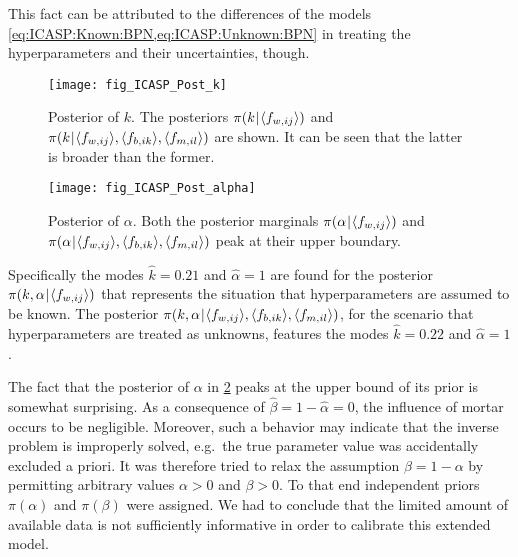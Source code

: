 This fact can be attributed to the differences of the models \cref{eq:ICASP:Known:BPN,eq:ICASP:Unknown:BPN} in treating the hyperparameters and their uncertainties, though.
\begin{figure}[ht]
  \centering
  \texttt{[image: fig\_ICASP\_Post\_k]}
  \caption[Posterior of \(k\)]{Posterior of \(k\).
           The posteriors \(\pi(k {\:\!}|{\:\!} \langle{f_{w,ij}}\rangle)\) and \(\pi(k {\:\!}|{\:\!} \langle{f_{w,ij}}\rangle,\langle{f_{b,ik}}\rangle,\langle{f_{m,il}}\rangle)\) are shown.
           It can be seen that the latter is broader than the former.
          }
  \label{fig:ICASP:Post:k}
\end{figure}
\begin{figure}[ht]
  \centering
  \texttt{[image: fig\_ICASP\_Post\_alpha]}
  \caption[Posterior of \(\alpha\)]{Posterior of \(\alpha\).
           Both the posterior marginals \(\pi(\alpha {\:\!}|{\:\!} \langle{f_{w,ij}}\rangle)\) and \(\pi(\alpha {\:\!}|{\:\!} \langle{f_{w,ij}}\rangle,\langle{f_{b,ik}}\rangle,\langle{f_{m,il}}\rangle)\) peak at their upper boundary.
          }
  \label{fig:ICASP:Post:alpha}
\end{figure}
\par %
Specifically the modes \(\hat{k} = 0.21\) and \(\hat{\alpha} = 1\) are found for the posterior \(\pi(k,\alpha {\:\!}|{\:\!} \langle{f_{w,ij}}\rangle)\) that represents the situation that hyperparameters are assumed to be known.
The posterior \(\pi(k,\alpha {\:\!}|{\:\!} \langle{f_{w,ij}}\rangle,\langle{f_{b,ik}}\rangle,\langle{f_{m,il}}\rangle)\), for the scenario that hyperparameters are treated as unknowns, features the modes \(\hat{k} = 0.22\) and \(\hat{\alpha} = 1\).
\par %
The fact that the posterior of \(\alpha\) in \cref{fig:ICASP:Post:alpha} peaks at the upper bound of its prior is somewhat surprising.
As a consequence of \(\hat{\beta} = 1-\hat{\alpha} = 0\), the influence of mortar occurs to be negligible.
Moreover, such a behavior may indicate that the inverse problem is improperly solved, e.g.\ the true parameter value was accidentally excluded a priori.
It was therefore tried to relax the assumption \(\beta = 1-\alpha\) by permitting arbitrary values \(\alpha>0\) and \(\beta>0\).
To that end independent priors \(\pi(\alpha)\) and \(\pi(\beta)\) were assigned.
We had to conclude that the limited amount of available data is not sufficiently informative in order to calibrate this extended model.
\par %
